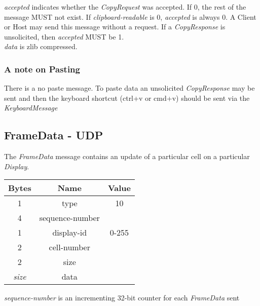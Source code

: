 \documentclass{article}
\begin{document}
    \emph{accepted} indicates whether the \emph{CopyRequest} was accepted. If 0, the rest of the message MUST not exist.
    If \emph{clipboard-readable} is 0, \emph{accepted} is always 0. A Client or Host may send this message without a
    request.
    If a \emph{CopyResponse} is unsolicited, then \emph{accepted} MUST be 1.\\

    \emph{data} is zlib compressed.

    \subsubsection{A note on Pasting}

    There is a no paste message. To paste data an unsolicited \emph{CopyResponse} may be sent and then the keyboard
    shortcut (ctrl+v or cmd+v) should be sent via the \emph{KeyboardMessage}

    \subsection{FrameData - UDP}
    The \emph{FrameData} message contains an update of a particular cell on a particular \emph{Display}.

    \begin{center}
        \begin{tabular}{|c|c|c|}
            \hline
            \textbf{Bytes} & \textbf{Name}   & \textbf{Value} \\
            \hline
            1              & type            & 10             \\
            \hline
            4              & sequence-number &                \\
            \hline
            1              & display-id      & 0-255          \\
            \hline
            2              & cell-number     &                \\
            \hline
            2              & size            &                \\
            \hline
            \emph{size}    & data            &                \\
            \hline
        \end{tabular}
    \end{center}

    \emph{sequence-number} is an incrementing 32-bit counter for each \emph{FrameData} sent
\end{document}
